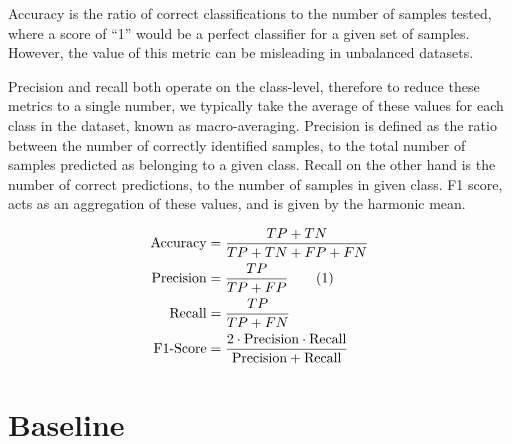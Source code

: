 \documentclass[main.tex]{subfiles}
\begin{document}
Accuracy is the ratio of correct classifications to the number of samples tested, where a score of ``1'' would be a perfect classifier for a given set of samples. However, the value of this metric can be misleading in unbalanced datasets. 

Precision and recall both operate on the class-level, therefore to reduce these metrics to a single number, we typically take the average of these values for each class in the dataset, known as macro-averaging. Precision is defined as the ratio between the number of correctly identified samples, to the total number of samples predicted as belonging to a given class. Recall on the other hand is the number of correct predictions, to the number of samples in given class. F1 score, acts as an aggregation of these values, and is given by the harmonic mean.

\begin{align}
    \text{Accuracy} &= \frac{TP + TN}{TP + TN + FP + FN}\nonumber\\
    \text{Precision} &= \frac{TP}{TP + FP} \refstepcounter{equation} \tag{\theequation}\label{eq:metrics}\\
    \text{Recall} &= \frac{TP}{TP + FN}\nonumber\\ 
    \text{F1-Score} &=  \frac{2 \cdot \text{Precision} \cdot \text{Recall}}{\text{Precision} + \text{Recall}}\nonumber
\end{align}


\section{Baseline}
\end{document}
